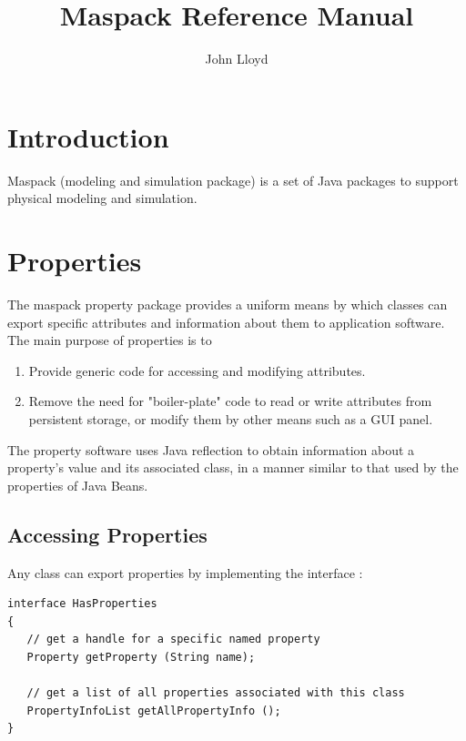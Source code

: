 \documentclass{article}
\title{Maspack Reference Manual}
\author{John Lloyd}
\date{}
\begin{document}
\maketitle

\iflatexml{\large\pubdate}\fi

\tableofcontents

\section{Introduction}

Maspack (modeling and simulation package) is a set of Java packages to
support physical modeling and simulation.

\section{Properties}
\label{properties:sec}

The maspack property package provides a uniform means by which classes
can export specific attributes and information about them to
application software.  The main purpose of properties is to

\begin{enumerate}

\item Provide generic code for accessing and modifying attributes. 

\item Remove the need for "boiler-plate" code to read or write attributes
from persistent storage, or modify them by other means such as a GUI
panel.

\end{enumerate}

The property software uses Java reflection to obtain information about
a property's value and its associated class, in a manner similar to
that used by the properties of Java Beans.

\subsection{Accessing Properties}

Any class can export properties by implementing the
interface :

\begin{lstlisting}[]
interface HasProperties
{
   // get a handle for a specific named property
   Property getProperty (String name);

   // get a list of all properties associated with this class
   PropertyInfoList getAllPropertyInfo ();
}
\end{lstlisting}
\end{document}
